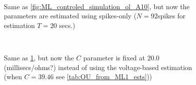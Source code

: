 \documentclass{article}
\begin{document}
\begin{figure}[h] 
\begin{center}
\\
\caption[labelInTOC]{Same as \cref{fig:ML_controled_simulation_ol_A10}, but now
the parameters are estimated using spikes-only ($N=92 $spikes for estimation
$T=20$ secs.)}
\label{fig:ML_controled_simulation_ol_A10_spikesonly}
\end{center}
\end{figure}
\begin{figure}[h] 
\begin{center}
\\
\caption[labelInTOC]{Same as
\cref{fig:ML_controled_simulation_ol_A10_spikesonly}, but now the $C$ parameter
is fixed at $20.0$ (millisecs/ohms?) instead of using the voltage-based
estimation (when $C=39.46$ see \cref{tab:OU_from_ML1_ests}))}
\label{fig:ML_controled_simulation_ol_A10_spikesonly_C20}
\end{center}
\end{figure}



\end{document}
